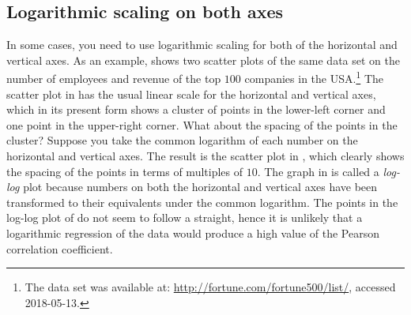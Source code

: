 \documentclass[a4paper,oneside,12pt]{article}
\begin{document}

\subsection{Logarithmic scaling on both axes}

In some cases, you need to use logarithmic scaling for both of the
horizontal and vertical axes.  As an example,
 shows two scatter plots of the same
data set on the number of employees and revenue of the top $100$
companies in the USA.\footnote{
  The data set was available at:
  \url{http://fortune.com/fortune500/list/},
  accessed 2018-05-13.
}
The scatter plot in  has the
usual linear scale for the horizontal and vertical axes, which in its
present form shows a cluster of points in the lower-left corner and
one point in the upper-right corner.  What about the spacing of the
points in the cluster?  Suppose you take the common logarithm of each
number on the horizontal and vertical axes.  The result is the scatter
plot in , which clearly shows the
spacing of the points in terms of multiples of $10$.  The graph in
 is called a \emph{log-log} plot
because numbers on both the horizontal and vertical axes have been
transformed to their equivalents under the common logarithm.  The
points in the log-log plot of  do
not seem to follow a straight, hence it is unlikely that a logarithmic
regression of the data would produce a high value of the Pearson
correlation coefficient.
\end{document}
